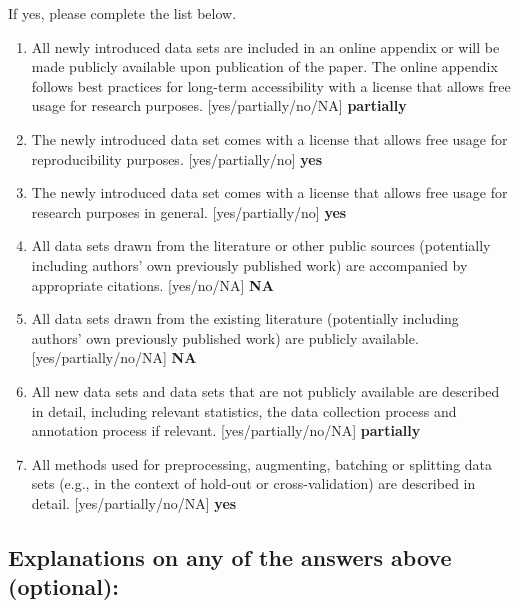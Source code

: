 If yes, please complete the list below.
\begin{enumerate}
    \item
    All newly introduced data sets
    are included in an online appendix
    or will be made publicly available upon publication of the paper.
    The online appendix follows best practices for long-term accessibility with a license
    that allows free usage for research purposes.
    [yes/partially/no/NA] \textbf{partially}
    \item The newly introduced data set comes with a license that
    allows free usage for reproducibility purposes.
    [yes/partially/no] \textbf{yes}
    \item The newly introduced data set comes with a license that
    allows free usage for research purposes in general.
    [yes/partially/no] \textbf{yes}
    \item All data sets drawn from the literature or other public sources (potentially including authors' own previously published work) are accompanied by appropriate citations.
    [yes/no/NA] \textbf{NA}
    \item All data sets drawn from the existing literature (potentially including authors’ own previously published work) are publicly available. [yes/partially/no/NA] \textbf{NA}
    \item All new data sets and data sets that are not publicly available are described in detail, including relevant statistics, the data collection process and annotation process if relevant.
    [yes/partially/no/NA] \textbf{partially}
    \item
    All methods used for preprocessing, augmenting, batching or splitting data sets (e.g., in the context of hold-out or cross-validation)
    are described in detail. [yes/partially/no/NA] \textbf{yes}
\end{enumerate}

\subsection*{Explanations on any of the answers above (optional):}

